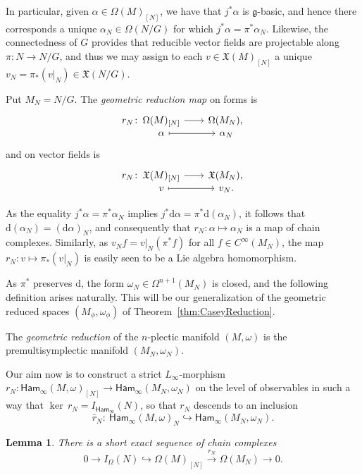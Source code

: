 \documentclass[pdftex]{sigma}
\numberwithin{equation}{section}
\newtheorem{Lemma}[Theorem]{Lemma}
\newcommand{\g}{\mathfrak{g}}
\newcommand{\Ham}{\mathsf{Ham}}
\newcommand{\X}{\mathfrak{X}}
\renewcommand{\d}{\mathrm{d}}
\newcommand{\morphism}[5]{%
  \begin{tikzcd}[
    column sep=2em,
    row sep=-.5ex,
    ampersand replacement=\&
  ]
  #1\colon~ \&[-3em]
  #2\vphantom{#3} \arrow[r] \&
  #3\vphantom{#2} \\
  \&
  #4\vphantom{#5} \arrow[r,mapsto] \&
  #5\vphantom{#4}
  \end{tikzcd}%
}
\begin{document}
In particular, given $\alpha\in\Omega(M)_{[N]}$, we have that $j^\ast \alpha$ is $\g$-basic, and hence there corresponds a unique $\alpha_N\in\Omega(N/G)$ for which $j^*\alpha=\pi^*\alpha_N$.
Likewise, the connectedness of $G$ provides that reducible vector fields are projectable along $\pi\colon N\to N/G$, and thus we may assign to each $v\in\X(M)_{[N]}$ a unique $v_N=\pi_*(v|_N)\in\X(N/G)$.

\begin{Definition}\label{def:geometric_reduction_map}
	Put $M_N=N/G$. The \emph{geometric reduction map} on forms is
	\begin{displaymath}
		\morphism{r_N}
		{\Omega(M)_{[N]}	}{\Omega(M_N),}
		{\alpha}{\alpha_N}
	\end{displaymath}
	and on vector fields is
	\begin{displaymath}
		\morphism{r_N}
		{\X(M)_{[N]}	}{\X(M_N),}
		{v}{v_N.}
	\end{displaymath}
\end{Definition}

\begin{Remark}
	As the equality $j^*\alpha=\pi^*\alpha_N$ implies $j^*\d\alpha = \pi^*\d(\alpha_N)$, it follows that $\d(\alpha_N)=(\d\alpha)_N$, and consequently that $r_N\colon \alpha\mapsto\alpha_N$ is a map of chain complexes. Similarly, as $v_N f = v|_N (\pi^*f)$ for all $f\in C^\infty(M_N)$, the map $r_N\colon v\mapsto \pi_*(v|_N)$ is easily seen to be a Lie algebra homomorphism.
\end{Remark}

As $\pi^*$ preserves $\d$, the form $\omega_N\in\Omega^{n+1}(M_N)$ is closed, and the following definition arises naturally. This will be our generalization of the geometric reduced spaces $(M_\phi,\omega_\phi)$ of Theorem~\ref{thm:CaseyReduction}.

\begin{Definition}\label{def:geometric_reduction}
	The \emph{geometric reduction} of the $n$-plectic manifold $(M,\omega)$ is the premultisymplectic manifold $(M_N,\omega_N)$.
\end{Definition}

Our aim now is to construct a strict $L_\infty$-morphism $r_N\colon \Ham_\infty(M,\omega)_{[N]}\to \Ham_\infty(M_N,\omega_N)$ on the level of observables in such a way that $\ker\,r_N=I_{\Ham_\infty}(N)$, so that $r_N$ descends to an inclusion
\[
	\bar{r}_N\colon \ \Ham_\infty(M,\omega)_N \hookrightarrow \Ham_\infty(M_N,\omega_N).
\]

\begin{Lemma}\label{lem:SesReducibleForms}
	There is a short exact sequence of chain complexes
	\[
		0\to I_\Omega(N)\hookrightarrow\Omega(M)_{[N]}\xrightarrow{r_N}  \Omega(M_N)\to 0.
	\]
\end{Lemma}
\end{document}
